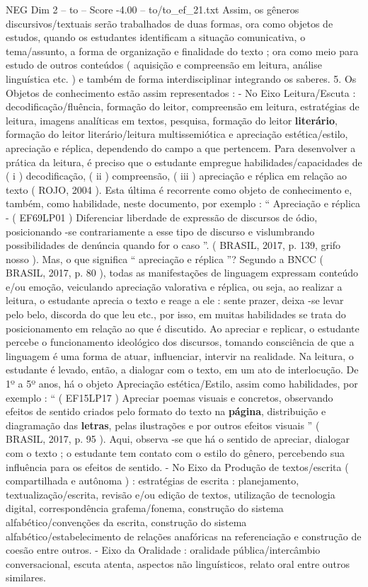 \begin{textsample}{NEG Dim 2 – to – Score -4.00 – to/to\_ef\_21.txt}
Assim, os gêneros discursivos/textuais serão trabalhados de duas formas, ora como objetos de estudos, quando os estudantes identificam a situação comunicativa, o tema/assunto, a forma de organização e finalidade do texto ; ora como meio para estudo de outros conteúdos ( aquisição e compreensão em leitura, análise linguística etc. ) e também de forma interdisciplinar integrando os saberes. 5.
Os Objetos de conhecimento estão assim representados : - No Eixo Leitura/Escuta : decodificação/fluência, formação do leitor, compreensão em leitura, estratégias de leitura, imagens analíticas em textos, pesquisa, formação do leitor \textbf{literário}, formação do leitor literário/leitura multissemiótica e apreciação estética/estilo, apreciação e réplica, dependendo do campo a que pertencem.
Para desenvolver a prática da leitura, é preciso que o estudante empregue habilidades/capacidades de ( i ) decodificação, ( ii ) compreensão, ( iii ) apreciação e réplica em relação ao texto ( ROJO, 2004 ).
Esta última é recorrente como objeto de conhecimento e, também, como habilidade, neste documento, por exemplo : “ Apreciação e réplica - ( EF69LP01 ) Diferenciar liberdade de expressão de discursos de ódio, posicionando -se contrariamente a esse tipo de discurso e vislumbrando possibilidades de denúncia quando for o caso ”. ( BRASIL, 2017, p. 139, grifo nosso ).
Mas, o que significa “ apreciação e réplica ”?
Segundo a BNCC ( BRASIL, 2017, p. 80 ), todas as manifestações de linguagem expressam conteúdo e/ou emoção, veiculando apreciação valorativa e réplica, ou seja, ao realizar a leitura, o estudante aprecia o texto e reage a ele : sente prazer, deixa -se levar pelo belo, discorda do que leu etc., por isso, em muitas habilidades se trata do posicionamento em relação ao que é discutido.
Ao apreciar e replicar, o estudante percebe o funcionamento ideológico dos discursos, tomando consciência de que a linguagem é uma forma de atuar, influenciar, intervir na realidade.
Na leitura, o estudante é levado, então, a dialogar com o texto, em um ato de interlocução.
De 1º a 5º anos, há o objeto Apreciação estética/Estilo, assim como habilidades, por exemplo : “ ( EF15LP17 ) Apreciar poemas visuais e concretos, observando efeitos de sentido criados pelo formato do texto na \textbf{página}, distribuição e diagramação das \textbf{letras}, pelas ilustrações e por outros efeitos visuais ” ( BRASIL, 2017, p. 95 ).
Aqui, observa -se que há o sentido de apreciar, dialogar com o texto ; o estudante tem contato com o estilo do gênero, percebendo sua influência para os efeitos de sentido. - No Eixo da Produção de textos/escrita ( compartilhada e autônoma ) : estratégias de escrita : planejamento, textualização/escrita, revisão e/ou edição de textos, utilização de tecnologia digital, correspondência grafema/fonema, construção do sistema alfabético/convenções da escrita, construção do sistema alfabético/estabelecimento de relações anafóricas na referenciação e construção de coesão entre outros. - Eixo da Oralidade : oralidade pública/intercâmbio conversacional, escuta atenta, aspectos não linguísticos, relato oral entre outros similares.

\end{textsample}
